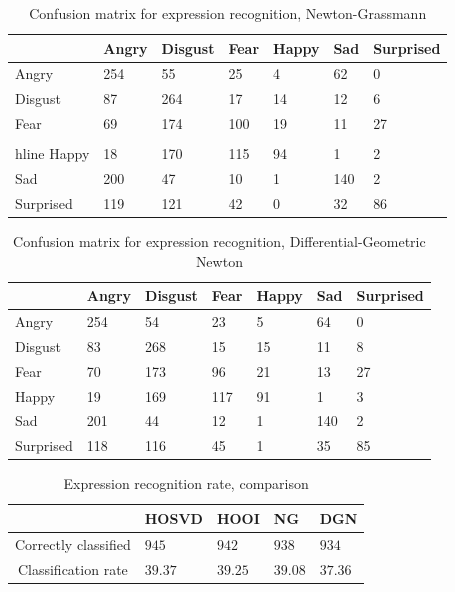 \begin{table}[h]
\centering
\begin{tabular}{|l|l|l|l|l|l|l|}
\hline
& Angry & Disgust & Fear & Happy & Sad & Surprised \\ \hline
Angry     & 254 &  55 &  25 &  4 &  62 &  0 \\    \hline
Disgust   & 87 &  264 &  17 &  14 &  12 &  6 \\    \hline
Fear      & 69 &  174 &  100 &  19 &  11 &  27 \\ \\hline
Happy     & 18 &  170 &  115 &  94 &  1 &  2 \\    \hline
Sad       & 200 &  47 &  10 &  1 &  140 &  2 \\    \hline
Surprised & 119 &  121 &  42 &  0 &  32 &  86 \\  \hline
\end{tabular}
\caption{Confusion matrix for expression recognition, Newton-Grassmann}
\label{expr_rec_newgr_confmatr}
\end{table}


\begin{table}[h]
\centering
\begin{tabular}{|l|l|l|l|l|l|l|}
\hline
& Angry & Disgust & Fear & Happy & Sad & Surprised \\ \hline
Angry     & 254 &  54 &  23 &  5 &  64 &  0 \\  \hline
Disgust   & 83 &  268 &  15 &  15 &  11 &  8 \\  \hline
Fear      & 70 &  173 &  96 &  21 &  13 &  27 \\ \hline
Happy     & 19 &  169 &  117 &  91 &  1 &  3 \\  \hline
Sad       & 201 &  44 &  12 &  1 &  140 &  2 \\  \hline
Surprised & 118 &  116 &  45 &  1 &  35 &  85 \\ \hline
\end{tabular}
\caption{Confusion matrix for expression recognition, Differential-Geometric Newton}
\label{expr_rec_dg_newton_confmatr}
\end{table}

\begin{table}[h]
\centering
\begin{tabular}{|c|l|l|l|l|}
\hline
& HOSVD & HOOI & NG & DGN \\ \hline
Correctly classified & $945$  & $942$  & $938$ & $934$ \\ \hline
Classification rate& $39.37$  & $39.25$  & $39.08$ & $37.36$ \\ \hline
\end{tabular}
\caption{Expression recognition rate, comparison}
\label{expr_rec_rate_total}
\end{table}
